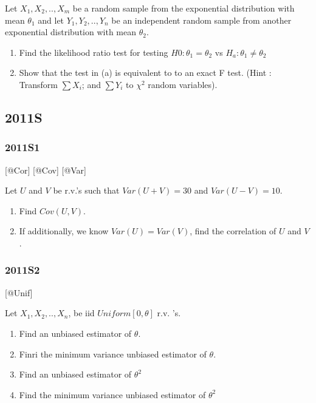 \documentclass[6pt,twocolumn,Portrait]{article}
\begin{document}
Let \(X_1,X_2,..,X_{m}\) be a random sample from the exponential
distribution with mean \(\theta_1\) and let \(Y_1,Y_2,..,Y_{n}\) be an
independent random sample from another exponential distribution with
mean \(\theta_2\).

\begin{enumerate}
\def\labelenumi{(\alph{enumi})}
\item
  Find the likelihood ratio test for testing \(H0:\theta_1=\theta_2\) vs
  \(H_a:\theta_1\neq\theta_2\)
\item
  Show that the test in (a) is equivalent to to an exact F test. (Hint :
  Transform \(\sum X_i\); and \(\sum Y_i\) to \(\chi^2\) random
  variables).
\end{enumerate}

\hypertarget{s-5}{%
\subsection{2011S}\label{s-5}}

\hypertarget{s1-2}{%
\subsubsection{2011S1}\label{s1-2}}

{[}@Cor{]} {[}@Cov{]} {[}@Var{]}

Let \(U\) and \(V\) be r.v.'s such that \(Var(U+V)=30\) and
\(Var(U-V)=10\).

\begin{enumerate}
\def\labelenumi{(\alph{enumi})}
\item
  Find \(Cov(U,V)\).
\item
  If additionally, we know \(Var(U)=Var(V)\), find the correlation of
  \(U\) and \(V\).
\end{enumerate}

\hypertarget{s2-2}{%
\subsubsection{2011S2}\label{s2-2}}

{[}@Unif{]}

Let \(X_1,X_2,..,X_{n}\), be iid \(Uniform[0,\theta]\) r.v. 's.

\begin{enumerate}
\def\labelenumi{(\alph{enumi})}
\item
  Find an unbiased estimator of \(\theta\).
\item
  Finri the minimum variance unbiased estimator of \(\theta\).
\item
  Find an unbiased estimator of \(\theta^2\)
\item
  Find the minimum variance unbiased estimator of \(\theta^2\)
\end{enumerate}
\end{document}
